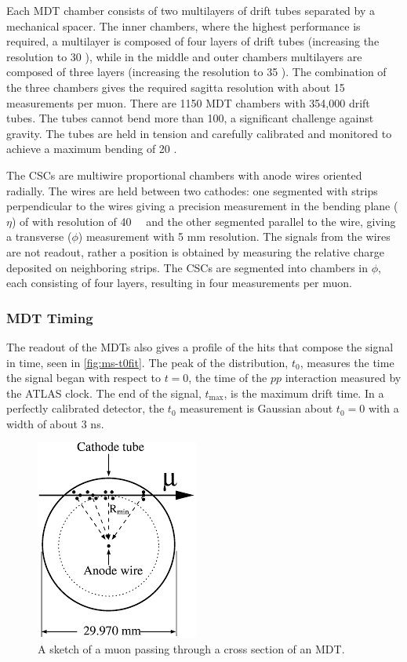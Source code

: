 Each \ac{MDT} chamber consists of two multilayers of drift tubes separated by a mechanical spacer. The inner chambers, where the highest performance is required, a multilayer is composed of four layers of drift tubes (increasing the resolution to 30 \um), while in the middle and outer chambers multilayers are composed of three layers (increasing the resolution to 35 \um). The combination of the three chambers gives the required sagitta resolution with about 15 measurements per muon. There are 1150 \ac{MDT} chambers with 354,000 drift tubes. The tubes cannot bend more than 100\um, a significant challenge against gravity. The tubes are held in tension and carefully calibrated and monitored to achieve a maximum bending of 20 \um. 

The \ac{CSC}s are multiwire proportional chambers with anode wires oriented radially. The wires are held between two cathodes: one segmented with strips perpendicular to the wires giving a precision measurement in the bending plane ($\eta$) of with resolution of 40~\um~ and the other segmented parallel to the wire, giving a transverse ($\phi$) measurement with 5 mm resolution. The signals from the wires are not readout, rather a position is obtained by measuring the relative charge deposited on neighboring strips. The \ac{CSC}s are segmented into chambers in $\phi$, each consisting of four layers, resulting in four measurements per muon.


\subsubsection{MDT Timing}
\label{sec:mdt-timing}
The readout of the \ac{MDT}s also gives a profile of the hits that compose the signal in time, seen in \autoref{fig:ms-t0fit}. The peak of the distribution, $t_{0}$, measures the time the signal began with respect to $t=0$, the time of the $pp$ interaction measured by the \ac{ATLAS} clock. The end of the signal, $t_{\text{max}}$, is the maximum drift time. In a perfectly calibrated detector, the $t_{0}$ measurement is Gaussian about $t_{0} = 0$ with a width of about 3 ns. 



\begin{figure}[htbp]
\centering
\includegraphics[width=.4\textwidth]{figures/Detector/ms-drift.png}
\caption{A sketch of a muon passing through a cross section of an \ac{MDT}. \cite{atlas-overview}}
\label{fig:ms-drift}
\end{figure}

